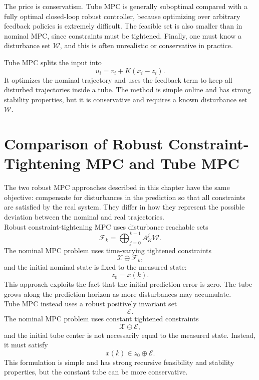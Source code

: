 The price is conservatism. Tube MPC is generally suboptimal compared with a fully optimal
closed-loop robust controller, because optimizing over arbitrary feedback policies is extremely
difficult. The feasible set is also smaller than in nominal MPC, since constraints must be
tightened. Finally, one must know a disturbance set \(\mathcal W\), and this is often unrealistic
or conservative in practice.

\begin{theorembox}
Tube MPC splits the input into
\[
    u_i=v_i+K(x_i-z_i).
\]
It optimizes the nominal trajectory and uses the feedback term to keep all disturbed trajectories
inside a tube. The method is simple online and has strong stability properties, but it is
conservative and requires a known disturbance set \(\mathcal W\).
\end{theorembox}

\section{Comparison of Robust Constraint-Tightening MPC and Tube MPC}

The two robust MPC approaches described in this chapter have the same objective: compensate
for disturbances in the prediction so that all constraints are satisfied by the real system. They
differ in how they represent the possible deviation between the nominal and real trajectories.\\

Robust constraint-tightening MPC uses disturbance reachable sets
\[
    \mathcal F_k
    =
    \bigoplus_{j=0}^{k-1}A_K^j\mathcal W.
\]
The nominal MPC problem uses time-varying tightened constraints
\[
    \mathcal X\ominus\mathcal F_k,
\]
and the initial nominal state is fixed to the measured state:
\[
    z_0=x(k).
\]
This approach exploits the fact that the initial prediction error is zero. The tube grows along
the prediction horizon as more disturbances may accumulate.\\

Tube MPC instead uses a robust positively invariant set
\[
    \mathcal E.
\]
The nominal MPC problem uses constant tightened constraints
\[
    \mathcal X\ominus\mathcal E,
\]
and the initial tube center is not necessarily equal to the measured state. Instead, it must
satisfy
\[
    x(k)\in z_0\oplus\mathcal E.
\]
This formulation is simple and has strong recursive feasibility and stability properties, but the
constant tube can be more conservative.


